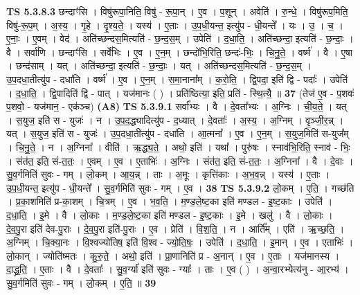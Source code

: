 \documentclass[17pt]{extarticle}
\begin{document}
                  \newline
                                \textbf{ TS 5.3.8.3} \newline
                  छन्दाꣳ॑सि । विषु॑रूपा॒निति॒ विषु॑ - रू॒पा॒न् । ए॒व । प॒शून् । अवेति॑ । रु॒न्धे॒ । विषु॑रूप॒मिति॒ विषु॑-रू॒प॒म् । अ॒स्य॒ । गृ॒हे । दृ॒श्य॒ते॒ । यस्य॑ । ए॒ताः । उ॒प॒धी॒यन्त॒ इत्यु॑प - धी॒यन्ते᳚ । यः । उ॒ । च॒ । ए॒नाः॒ । ए॒वम् । वेद॑ । अति॑च्छन्दस॒मित्यति॑ - छ॒न्द॒स॒म् । उपेति॑ । द॒धा॒ति॒ । अति॑च्छन्दा॒ इत्यति॑ - छ॒न्दाः॒ । वै । सर्वा॑णि । छन्दाꣳ॑सि । सर्वे॑भिः । ए॒व । ए॒न॒म् । छन्दो॑भि॒रिति॒ छन्दः॑-भिः॒ । चि॒नु॒ते॒ । वर्ष्म॑ । वै । ए॒षा । छन्द॑साम् । यत् । अति॑च्छन्दा॒ इत्यति॑ - छ॒न्दाः॒ । यत् । अति॑च्छन्दस॒मित्यति॑ - छ॒न्द॒स॒म् । उ॒प॒दधा॒तीत्यु॑प - दधा॑ति । वर्ष्म॑ । ए॒व । ए॒न॒म् । स॒मा॒नाना᳚म् । क॒रो॒ति॒ । द्वि॒पदा॒ इति॑ द्वि - पदाः᳚ । उपेति॑ । द॒धा॒ति॒ । द्वि॒पादिति॑ द्वि - पात् । यज॑मानः ( ) । प्रति॑ष्ठित्या॒ इति॒ प्रति॑ - स्थि॒त्यै॒ ॥ \textbf{  37 } \newline
                  \newline
                      (तेज॑ ए॒व - प॒शवः॑ प॒शवो॒ - यज॑मान॒ - एक॑ञ्च)  \textbf{(A8)} \newline \newline
                                \textbf{ TS 5.3.9.1} \newline
                  सर्वा᳚भ्यः । वै । दे॒वता᳚भ्यः । अ॒ग्निः । ची॒य॒ते॒ । यत् । स॒युज॒ इति॑ स - युजः॑ । न । उ॒प॒द॒द्ध्यादित्यु॑प - द॒ध्यात् । दे॒वताः᳚ । अ॒स्य॒ । अ॒ग्निम् । वृ॒ञ्जी॒र॒न्न् । यत् । स॒युज॒ इति॑ स - युजः॑ । उ॒प॒दधा॒तीत्यु॑प - दधा॑ति । आ॒त्मना᳚ । ए॒व । ए॒न॒म् । स॒युज॒मिति॑ स-युज᳚म् । चि॒नु॒ते॒ । न । अ॒ग्निना᳚ । वीति॑ । ऋ॒द्ध्य॒ते॒ । अथो॒ इति॑ । यथा᳚ । पुरु॑षः । स्नाव॑भि॒रिति॒ स्नाव॑ - भिः॒ । संत॑त॒ इति॒ सं-त॒तः॒ । ए॒वम् । ए॒व । ए॒ताभिः॑ । अ॒ग्निः । संत॑त॒ इति॒ सं-त॒तः॒ । अ॒ग्निना᳚ । वै । दे॒वाः । सु॒व॒र्गमिति॑ सुवः - गम् । लो॒कम् । आ॒य॒न्न् । ताः । अ॒मूः । कृत्ति॑काः । अ॒भ॒व॒न्न् । यस्य॑ । ए॒ताः । उ॒प॒धी॒यन्त॒ इत्यु॑प - धी॒यन्ते᳚ । सु॒व॒र्गमिति॑ सुवः - गम् । ए॒व । \textbf{  38} \newline
                  \newline
                                \textbf{ TS 5.3.9.2} \newline
                  लो॒कम् । ए॒ति॒ । गच्छ॑ति । प्र॒का॒शमिति॑ प्र-का॒शम् । चि॒त्रम् । ए॒व । भ॒व॒ति॒ । म॒ण्ड॒ले॒ष्ट॒का इति॑ मण्डल - इ॒ष्ट॒काः । उपेति॑ । द॒धा॒ति॒ । इ॒मे । वै । लो॒काः । म॒ण्ड॒ले॒ष्ट॒का इति॑ मण्डल - इ॒ष्ट॒काः । इ॒मे । खलु॑ । वै । लो॒काः । दे॒व॒पु॒रा इति॑ देव-पु॒राः । दे॒व॒पु॒रा इति॑-पु॒राः । ए॒व । प्रेति॑ । वि॒श॒ति॒ । न । आर्ति᳚म् । एति॑ । ऋ॒च्छ॒ति॒ । अ॒ग्निम् । चि॒क्या॒नः । वि॒श्वज्यो॑तिष॒ इति॑ वि॒श्व - ज्यो॒ति॒षः॒ । उपेति॑ । द॒धा॒ति॒ । इ॒मान् । ए॒व । एताभिः॑ । लो॒कान् । ज्योति॑ष्मतः । कु॒रु॒ते॒ । अथो॒ इति॑ । प्रा॒णानिति॑ प्र - अ॒नान् । ए॒व । ए॒ताः । यज॑मानस्य । दा॒द्ध्र॒ति॒ । ए॒ताः । वै । दे॒वताः᳚ । सु॒व॒र्ग्या॑ इति॑ सुवः - ग्याः᳚ । ताः । ए॒व ( ) । अ॒न्वा॒रभ्येत्य॑नु - आ॒रभ्य॑ । सु॒व॒र्गमिति॑ सुवः - गम् । लो॒कम् । ए॒ति॒ ॥ \textbf{  39 } \newline
\end{document}

